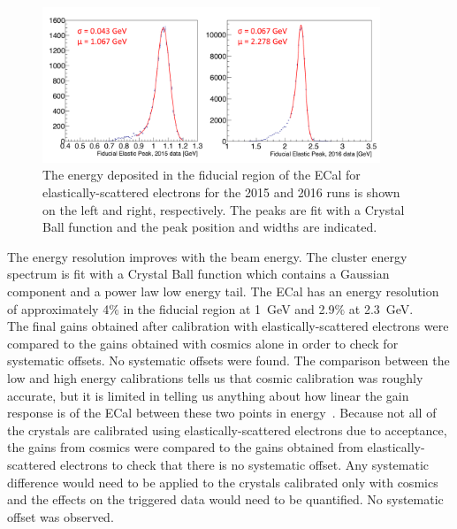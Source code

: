 \begin{figure}[htb]
  \centering
      \includegraphics[width=0.9\textwidth]{pics/performance/feePeakFid.png}
  \caption[Reconstructed elastic peak in the ECal for the engineering runs]{The energy deposited in the fiducial region of the ECal for elastically-scattered electrons for the 2015 and 2016 runs is shown on the left and right, respectively. The peaks are fit with a Crystal Ball function and the peak position and widths are indicated. }
  \label{Figure:FeeFidPeak}
\end{figure}
The energy resolution improves with the beam energy. The cluster energy spectrum is fit with a Crystal Ball function which contains a Gaussian component and a power law low energy tail. The ECal has an energy resolution of approximately 4$\%$ in the fiducial region at 1~GeV and 2.9$\%$ at 2.3~GeV. \\
\indent The final gains obtained after calibration with elastically-scattered electrons were compared to the gains obtained with cosmics alone in order to check for systematic offsets. No systematic offsets were found. The comparison between the low and high energy calibrations tells us that cosmic calibration was roughly accurate, but it is limited in telling us anything about how linear the gain response is of the ECal between these two points in energy~\cite{szumila-vance_hps_2016}. Because not all of the crystals are calibrated using elastically-scattered electrons due to acceptance, the gains from cosmics were compared to the gains obtained from elastically-scattered electrons to check that there is no systematic offset. Any systematic difference would need to be applied to the crystals calibrated only with cosmics and the effects on the triggered data would need to be quantified. No systematic offset was observed. 

